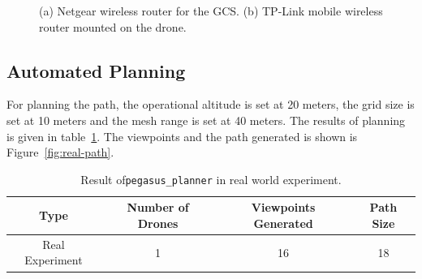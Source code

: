 \begin{figure}
	\centering
	\caption[Wireless routers used in experiment.]{\small 
		(a) Netgear wireless router for the GCS. (b) TP-Link mobile wireless router mounted on the drone. }
	
	\label{fig:real-routers}
\end{figure}

\subsection{Automated Planning}

For planning the path, the operational altitude is set at 20 meters, the grid size is set at 10 meters and the mesh range is set at 40 meters. The results of planning is given in table~\ref{tab:real-world-planning}. The viewpoints and the path generated is shown is Figure~\ref{fig:real-path}.
\begin{table}[t]
	\caption[Result of \texttt{pegasus\_planner} in real world experiment.]{\small Result of\texttt{pegasus\_planner} in real world experiment.}
	\begin{center}
		\begin{tabular}{c|c|c|c}
			\hline Type & Number of Drones & Viewpoints Generated & Path Size \\ \hline \hline
			Real Experiment & 1 & 16 & 18 \\ \hline
		\end{tabular}
	\end{center}
	\label{tab:real-world-planning}
\end{table} 


